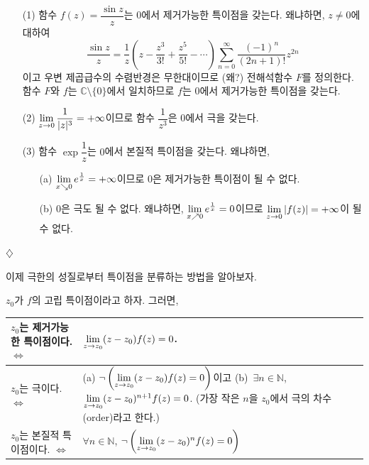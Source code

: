 \begin{saltexample}[label=example-4-14]{}{}
\begin{itemize}
\item[(1)] 함수 $f(z)=\dfrac{\sin z}z$는 $0$에서 제거가능한 특이점을 갖는다.
왜냐하면, $z\ne0$에 대하여
\[
\dfrac{\sin z}z = \dfrac 1z\left( z - \dfrac{z^3}{3!} + \dfrac{z^5}{5!} - \cdots
\right) \sum_{n=0}^\infty \dfrac{(-1)^n}{(2n+1)!}z^{2n}
\]
이고 우변 제곱급수의 수렴반경은 무한대이므로 (왜?)
전해석함수 $F$를 정의한다. 함수 $F$와 $f$는 $\mathbb C\setminus \{0\}$에서
일치하므로 $f$는 $0$에서 제거가능한 특이점을 갖는다.
\item[(2)] $\lim\limits_{z\to 0} \displaystyle\frac1{|z|^3} = + \infty$이므로
함수 $\dfrac1{z^3}$은 $0$에서 극을 갖는다.
\item[(3)] 함수 $\exp \dfrac1z$는 $0$에서 본질적 특이점을 갖는다. 왜냐하면,
\begin{itemize}
\item[(a)] $\lim\limits_{x\searrow 0} e^{\frac1x} = + \infty$이므로
$0$은 제거가능한 특이점이 될 수 없다.
\item[(b)] $0$은 극도 될 수 없다. 왜냐하면,
$\lim\limits_{x\nearrow 0} e^{\frac1x} =0$이므로  
$\lim\limits_{z\to 0} |f(z)| = + \infty$이 될 수 없다.
\end{itemize}
\end{itemize}
\hfill $\diamondsuit$
\end{saltexample}

이제 극한의 성질로부터 특이점을 분류하는 방법을 알아보자.

\begin{salttheorem} {}{} \label{thm-4-8}
$z_0$가 $f$의 고립 특이점이라고 하자. 그러면,
\begin{center}
{\footnotesize
\begin{tabular}{ |p{4cm}|p{6.5cm}| } 
 \hline
$z_0$는 제거가능한 특이점이다. \hfill $\Leftrightarrow$ 
& $\lim\limits_{z\to z_0} (z-z_0)f(z)=0$. \\ \hline 
$z_0$는 극이다. \hfill $\Leftrightarrow$ 
& (a) $\neg \left( \lim\limits_{z\to z_0} (z-z_0)f(z) = 0 \right)$이고 
(b)~$\exists n\in \mathbb N$, 
$\lim\limits_{z\to z_0} (z-z_0)^{n+1}f(z) = 0$.
(가장 작은 $n$을 $z_0$에서 극의 차수(order)라고 한다.) \\ \hline
$z_0$는 본질적 특이점이다. \hfill $\Leftrightarrow$ 
& $\forall n\in \mathbb N$,  
$\neg\left( \lim\limits_{z\to z_0} (z-z_0)^nf(z) = 0 \right)$ \\ 
 \hline
\end{tabular}
}
\end{center}
\end{salttheorem}

